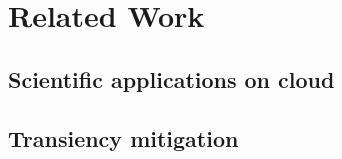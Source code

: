 \section{Related Work}

\subsection{Scientific applications on cloud}

\subsection{Transiency mitigation}



